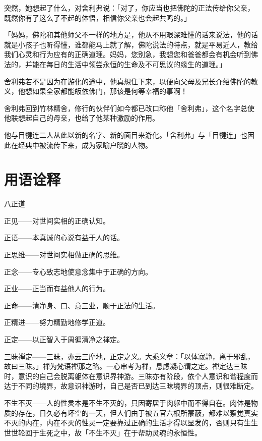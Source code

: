\documentclass[twoside,openany]{book}
\begin{document}
突然，她想起了什么，对舍利弗说：「对了，你应当也把佛陀的正法传给你父亲，既然你有了这么了不起的体悟，相信你父亲也会起共鸣的。」

「妈妈，佛陀和其他师父不一样的地方是，他从不用艰深难懂的话来说法，他的话就是小孩子也听得懂，谁都能马上就了解，佛陀说法的特点，就是平易近人，教给我们心灵和行为应有的正确道理。妈妈，您别急，我想您和爸爸都会有机会听到佛法的，并能在每日的生活中领尝永恒的生命及不可思议的缘生的道理。」

舍利弗若不是因为在游化的途中，他真想住下来，以便向父母及兄长介绍佛陀的教义，他想如果全家都能皈依佛门，那该是何等幸福的事啊！

舍利弗回到竹林精舍，修行的伙伴们如今都已改口称他「舍利弗」，这个名字总使他联想起自己的母亲，也给了他某种激励的作用。

他与目犍连二人从此以新的名字、新的面目来游化。「舍利弗」与「目犍连」也因此在经典中被流传下来，成为家喻户晓的人物。





\chapter*{用语诠释}

\textbullet 八正道

\textperiodcentered 正见——对世间实相的正确认知。

\textperiodcentered 正语——本真诚的心说有益于人的话。

\textperiodcentered 正思维——对世间实相做正确的思维。

\textperiodcentered 正念——专心致志地使意念集中于正确的方向。

\textperiodcentered 正业——正当而有益他人的行为。

\textperiodcentered 正命——清净身、口、意三业，顺于正法的生活。

\textperiodcentered 正精进——努力精勤地修学正道。

\textperiodcentered 正定——以正智入于周徧清净之禅定。

\textbullet 三昧禅定——三昧，亦云三摩地，正定之义。大乘义章：「以体寂静，离于邪乱，故曰三昧。」禅为梵语禅那之略。一心审考为禅，息虑凝心谓之定。禅定达三昧时，意识的自己会脱离躯体在意识界神游。三昧亦有阶段，依个人意识和谐程度而达于不同的境界，故意识神游时，自己是否已到达三昧境界的顶点，则很难断定。

\textbullet 不生不灭——人的性灵本是不生不灭的，只因寄居于肉躯中而不得自在。肉体是物质的存在，日久必有坏空的一天，但人们由于被五官六根所蒙蔽，都难以察觉真实不灭的内在，内在不灭的性灵一定要靠过正确的生活才得以显发的，否则只有生生世世轮回于生死之中，故「不生不灭」在于帮助灵魂的永恒性。
\end{document}
